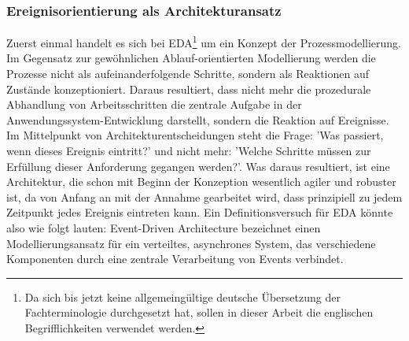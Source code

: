 \subsubsection*{Ereignisorientierung als Architekturansatz}
Zuerst einmal handelt es sich bei \ac{EDA}\footnote{Da sich bis jetzt keine allgemeingültige deutsche Übersetzung der Fachterminologie durchgesetzt hat, sollen in dieser Arbeit die englischen Begrifflichkeiten verwendet werden.} um ein Konzept der Prozessmodellierung. Im Gegensatz zur gewöhnlichen Ablauf-orientierten Modellierung werden die Prozesse nicht als aufeinanderfolgende Schritte, sondern als Reaktionen auf Zustände konzeptioniert. Daraus resultiert, dass nicht mehr die prozedurale Abhandlung von Arbeitsschritten die zentrale Aufgabe in der Anwendungssystem-Entwicklung darstellt, sondern die Reaktion auf Ereignisse. Im Mittelpunkt von Architekturentscheidungen steht die Frage: 'Was passiert, wenn dieses Ereignis eintritt?' und nicht mehr: 'Welche Schritte müssen zur Erfüllung dieser Anforderung gegangen werden?'. Was daraus resultiert, ist eine Architektur, die schon mit Beginn der Konzeption wesentlich agiler und robuster ist, da von Anfang an mit der Annahme gearbeitet wird, dass prinzipiell zu jedem Zeitpunkt jedes Ereignis eintreten kann. \cite[Vgl.][S.30]{EDA2010}
Ein Definitionsversuch für \ac{EDA} könnte also wie folgt lauten: Event-Driven Architecture bezeichnet einen Modellierungsansatz für ein verteiltes, asynchrones System, das verschiedene Komponenten durch eine zentrale Verarbeitung von Events verbindet. \cite[Vgl.][S. 248]{CLOUD2021}
